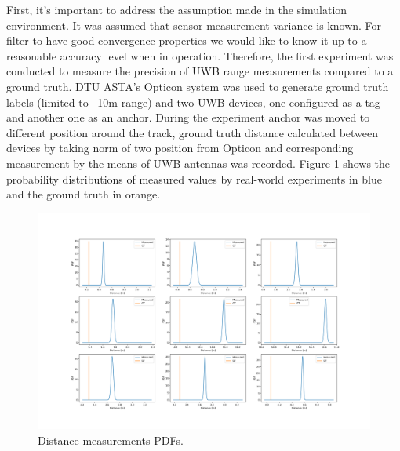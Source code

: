 First, it's important to address the assumption made in the simulation environment. It was assumed that sensor measurement variance is known. For filter to have good convergence properties we would like to know it up to a reasonable accuracy level when in operation. Therefore, the first experiment was conducted to measure the precision of UWB range measurements compared to a ground truth. DTU ASTA's Opticon system was used to generate ground truth labels (limited to ~10m range) and two UWB devices, one configured as a tag and another one as an anchor. During the experiment anchor was moved to different position around the track, ground truth distance calculated between devices by taking norm of two position from Opticon and corresponding measurement by the means of UWB antennas was recorded. Figure \ref{fig:distancePDF} shows the probability distributions of measured values by real-world experiments in blue and the ground truth in orange.
\begin{figure}[H]
    \includegraphics[width=\linewidth]{figures/distancePDF.png}
    \caption{Distance measurements PDFs.}
    \label{fig:distancePDF}
\end{figure}

